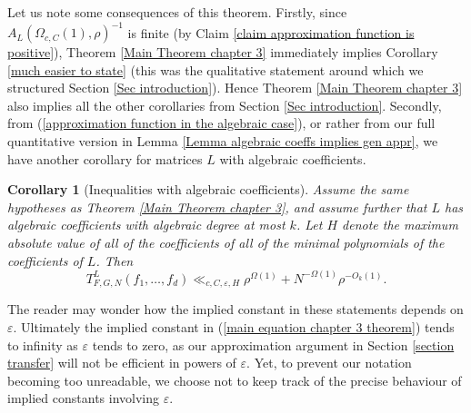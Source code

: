 \documentclass[12pt,a4paper,twoside,reqno]{amsart}
\newtheorem{Corollary}[Theorem]{Corollary}
\newtheorem{Remark}[Theorem]{Remark}
\numberwithin{equation}{section}
\begin{document}
Let us note some consequences of this theorem. Firstly, since $A_L(\Omega_{c,C}(1),\rho)^{-1}$ is finite (by Claim \ref{claim approximation function is positive}), Theorem \ref{Main Theorem chapter 3} immediately implies Corollary \ref{much easier to state} (this was the qualitative statement around which we structured Section \ref{Sec introduction}). Hence Theorem \ref{Main Theorem chapter 3} also implies all the other corollaries from Section \ref{Sec introduction}. Secondly, from (\ref{approximation function in the algebraic case}), or rather from our full quantitative version in Lemma \ref{Lemma algebraic coeffs implies gen appr}, we have another corollary for matrices $L$ with algebraic coefficients. 
\begin{Corollary}[Inequalities with algebraic coefficients]
\label{Corollary algebraic}
Assume the same hypotheses as Theorem \ref{Main Theorem chapter 3}, and assume further that $L$ has algebraic coefficients with algebraic degree at most $k$. Let $H$ denote the maximum absolute value of all of the coefficients of all of the minimal polynomials of the coefficients of $L$. Then \[ T^{L}_{F,G,N}(f_1,\dots,f_{d})\ll_{c,C,\varepsilon,H} \rho^{\Omega(1)} + N^{-\Omega(1)}\rho^{-O_k(1)}.\]
\end{Corollary}


The reader may wonder how the implied constant in these statements depends on $\varepsilon$. Ultimately the implied constant in (\ref{main equation chapter 3 theorem}) tends to infinity as $\varepsilon$ tends to zero, as our approximation argument in Section \ref{section transfer} will not be efficient in powers of $\varepsilon$. Yet, to prevent our notation becoming too unreadable, we choose not to keep track of the precise behaviour of implied constants involving $\varepsilon$.\\
\end{document}
